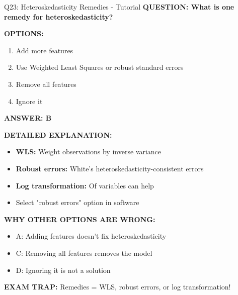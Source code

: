 \documentclass[8pt]{beamer}
\begin{document}
	\begin{frame}{Q23: Heteroskedasticity Remedies - Tutorial}
		\fontsize{6.5}{7.5}\selectfont
		\textbf{QUESTION: What is one remedy for heteroskedasticity?}
		
		\vspace{0.1cm}
		\textbf{OPTIONS:}
		\begin{enumerate}
			\item Add more features
			\item Use Weighted Least Squares or robust standard errors
			\item Remove all features
			\item Ignore it
		\end{enumerate}
		
		\vspace{0.1cm}
		\textcolor{myblue}{\textbf{ANSWER: B}}
		
		\vspace{0.1cm}
		\textbf{DETAILED EXPLANATION:}
		\begin{itemize}
			\item \textbf{WLS:} Weight observations by inverse variance
			\item \textbf{Robust errors:} White's heteroskedasticity-consistent errors
			\item \textbf{Log transformation:} Of variables can help
			\item Select "robust errors" option in software
		\end{itemize}
		
		\vspace{0.1cm}
		\textcolor{myred}{\textbf{WHY OTHER OPTIONS ARE WRONG:}}
		\begin{itemize}
			\item \textcolor{myred}{A:} Adding features doesn't fix heteroskedasticity
			\item \textcolor{myred}{C:} Removing all features removes the model
			\item \textcolor{myred}{D:} Ignoring it is not a solution
		\end{itemize}
		
		\textcolor{myred}{\textbf{EXAM TRAP:}} Remedies = \textcolor{myblue}{WLS, robust errors, or log transformation}!
	\end{frame}
	
\end{document}
